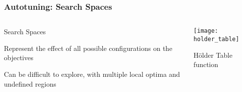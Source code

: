 \documentclass[10pt, compress, aspectratio=169, xcolor={table,usenames,dvipsnames}]{beamer}
\begin{document}
\begin{frame}
    \frametitle{Autotuning: Search Spaces}
    \begin{columns}[c]
            \begin{block}{Search Spaces}
                \vspace{.2cm}

                Represent the \alert{effect} of all possible
                \alert{configurations} on the \alert{objectives}

                Can be difficult to explore, with multiple \alert{local optima}
                and \alert{undefined regions}
            \end{block}

            \begin{block}{}
                \begin{center}
                    \texttt{[image: holder\_table]}

                    \alert{Hölder Table function}
                \end{center}
            \end{block}

    \end{columns}
\end{frame}
\end{document}

